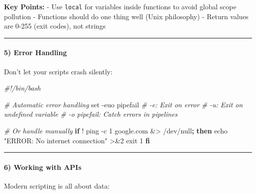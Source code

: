 \documentclass[
  english,
  paper=a4,
  oneside  ,captions=tableheading
]{scrartcl}
\newenvironment{Shaded}{}{}
\newcommand{\AttributeTok}[1]{\textcolor[rgb]{0.49,0.56,0.16}{#1}}
\newcommand{\BuiltInTok}[1]{\textcolor[rgb]{0.00,0.50,0.00}{#1}}
\newcommand{\CommentTok}[1]{\textcolor[rgb]{0.38,0.63,0.69}{\textit{#1}}}
\newcommand{\ControlFlowTok}[1]{\textcolor[rgb]{0.00,0.44,0.13}{\textbf{#1}}}
\newcommand{\DecValTok}[1]{\textcolor[rgb]{0.25,0.63,0.44}{#1}}
\newcommand{\FunctionTok}[1]{\textcolor[rgb]{0.02,0.16,0.49}{#1}}
\newcommand{\KeywordTok}[1]{\textcolor[rgb]{0.00,0.44,0.13}{\textbf{#1}}}
\newcommand{\NormalTok}[1]{#1}
\newcommand{\OperatorTok}[1]{\textcolor[rgb]{0.40,0.40,0.40}{#1}}
\newcommand{\OtherTok}[1]{\textcolor[rgb]{0.00,0.44,0.13}{#1}}
\newcommand{\StringTok}[1]{\textcolor[rgb]{0.25,0.44,0.63}{#1}}
\begin{document}
\textbf{Key Points:} - Use \texttt{local} for variables inside functions
to avoid global scope pollution - Functions should do one thing well
(Unix philosophy) - Return values are 0-255 (exit codes), not strings

\begin{center}\rule{0.5\linewidth}{0.5pt}\end{center}

\paragraph{5) Error Handling}\label{error-handling}

Don't let your scripts crash silently:

\begin{Shaded}
\begin{Highlighting}[]
\CommentTok{\#!/bin/bash}

\CommentTok{\# Automatic error handling}
\BuiltInTok{set} \AttributeTok{{-}euo}\NormalTok{ pipefail}
\CommentTok{\# {-}e: Exit on error}
\CommentTok{\# {-}u: Exit on undefined variable}
\CommentTok{\# {-}o pipefail: Catch errors in pipelines}

\CommentTok{\# Or handle manually}
\ControlFlowTok{if} \OtherTok{! }\FunctionTok{ping} \AttributeTok{{-}c}\NormalTok{ 1 google.com }\OperatorTok{\&\textgreater{}}\NormalTok{ /dev/null}\KeywordTok{;} \ControlFlowTok{then}
    \BuiltInTok{echo} \StringTok{"ERROR: No internet connection"} \OperatorTok{\textgreater{}\&}\DecValTok{2}
    \BuiltInTok{exit}\NormalTok{ 1}
\ControlFlowTok{fi}
\end{Highlighting}
\end{Shaded}

\begin{center}\rule{0.5\linewidth}{0.5pt}\end{center}

\paragraph{6) Working with APIs}\label{working-with-apis}

Modern scripting is all about data:
\end{document}

